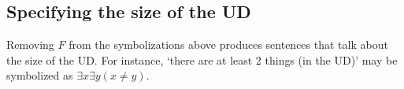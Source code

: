 {\subsection*{Specifying the size of the UD}

Removing $F$ from the symbolizations above produces sentences that talk about the size of the UD. For instance, `there are at least 2 things (in the UD)' may be symbolized as $\exists x\exists y(x \neq y)$.


}{} %


